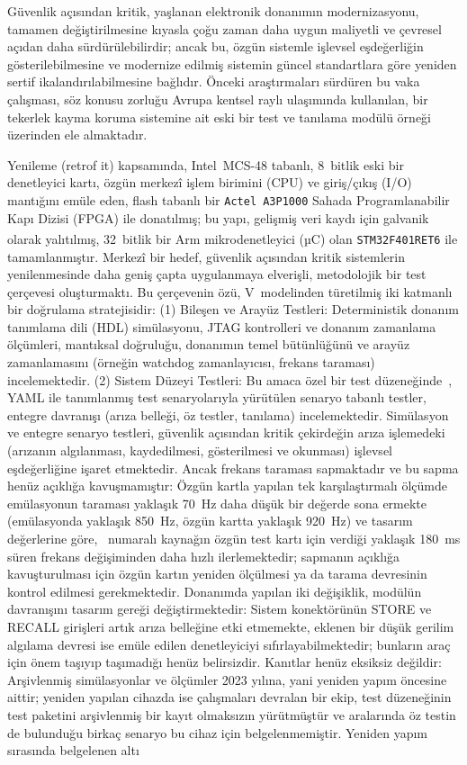 Güvenlik açısından kritik, yaşlanan elektronik donanımın modernizasyonu, tamamen değiştirilmesine kıyasla çoğu zaman daha uygun maliyetli ve çevresel açıdan daha sürdürülebilirdir; ancak bu, özgün sistemle işlevsel eşdeğerliğin gösterilebilmesine ve modernize edilmiş sistemin güncel standartlara göre yeniden ser\-ti\-f\kern0pt i\-ka\-lan\-dı\-rı\-la\-bil\-me\-sine bağlıdır. Önceki araştırmaları sürdüren bu vaka çalışması, söz konusu zorluğu Avrupa kentsel raylı ulaşımında kullanılan, bir tekerlek kayma koruma sistemine ait eski bir test ve tanılama modülü örneği üzerinden ele almaktadır.

Yenileme (retrof\kern0pt it) kapsamında, Intel~MCS-48 tabanlı, 8~bitlik eski bir denetleyici kartı, özgün merkezî işlem birimini (CPU) ve giriş/çıkış (I/O) mantığını emüle eden, flash tabanlı bir \texttt{Actel~A3P1000} Sahada Programlanabilir Kapı Dizisi (FPGA) ile donatılmış; bu yapı, gelişmiş veri kaydı için galvanik olarak yalıtılmış, 32~bitlik bir Arm\textsuperscript{\textregistered} mikrodenetleyici (µC) olan \texttt{STM32F401RET6} ile tamamlanmıştır. Merkezî bir hedef, güvenlik açısından kritik sistemlerin yenilenmesinde daha geniş çapta uygulanmaya elverişli, metodolojik bir test çerçevesi oluşturmaktı. Bu çerçevenin özü, V~modelinden türetilmiş iki katmanlı bir doğrulama stratejisidir: (1) Bileşen ve Arayüz Testleri: Deterministik donanım tanımlama dili (HDL) simülasyonu, JTAG kontrolleri ve donanım zamanlama ölçümleri, mantıksal doğruluğu, donanımın temel bütünlüğünü ve arayüz zamanlamasını (örneğin watchdog zamanlayıcısı, frekans taraması) incelemektedir. (2) Sistem Düzeyi Testleri: Bu amaca özel bir test düzeneğinde~\cite{dolata2023}, YAML ile tanımlanmış test senaryolarıyla yürütülen senaryo tabanlı testler, entegre davranışı (arıza belleği, öz testler, tanılama) incelemektedir. Simülasyon ve entegre senaryo testleri, güvenlik açısından kritik çekirdeğin arıza işlemedeki (arızanın algılanması, kaydedilmesi, gösterilmesi ve okunması) işlevsel eşdeğerliğine işaret etmektedir. Ancak frekans taraması sapmaktadır ve bu sapma henüz açıklığa kavuşmamıştır: Özgün kartla yapılan tek karşılaştırmalı ölçümde emülasyonun taraması yaklaşık 70~Hz daha düşük bir değerde sona ermekte (emülasyonda yaklaşık 850~Hz, özgün kartta yaklaşık 920~Hz) ve tasarım değerlerine göre,~\cite{dolata2023} numaralı kaynağın özgün test kartı için verdiği yaklaşık 180~ms süren frekans değişiminden daha hızlı ilerlemektedir; sapmanın açıklığa kavuşturulması için özgün kartın yeniden ölçülmesi ya da tarama devresinin kontrol edilmesi gerekmektedir. Donanımda yapılan iki değişiklik, modülün davranışını tasarım gereği değiştirmektedir: Sistem konektörünün STORE ve RECALL girişleri artık arıza belleğine etki etmemekte, eklenen bir düşük gerilim algılama devresi ise emüle edilen denetleyiciyi sıfırlayabilmektedir; bunların araç için önem taşıyıp taşımadığı henüz belirsizdir. Kanıtlar henüz eksiksiz değildir: Arşivlenmiş simülasyonlar ve ölçümler 2023 yılına, yani yeniden yapım öncesine aittir; yeniden yapılan cihazda ise çalışmaları devralan bir ekip, test düzeneğinin test paketini arşivlenmiş bir kayıt olmaksızın yürütmüştür ve aralarında öz testin de bulunduğu birkaç senaryo bu cihaz için belgelenmemiştir. Yeniden yapım sırasında belgelenen altı 